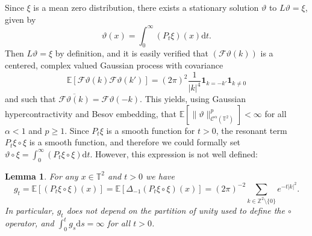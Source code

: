 \documentclass[11pt,a4paper]{article}
\newcommand{\mathd}{\mathrm{d}}
\newtheorem{lemma}[theorem]{Lemma}
\theoremstyle{remark}
\newcommand{\E}{\mathbb{E}}
\newcommand{\CC}{\ensuremath{\mathscr{C}}}
\newcommand{\CF}{\ensuremath{\mathscr{F}}}
\begin{document}
Since $\xi$ is a mean zero distribution, there exists a stationary solution $\vartheta$ to $L \vartheta = \xi$, given by
\[
   \vartheta(x) = \int_0^\infty (P_t \xi) (x) \mathd t.
\]
Then $L \vartheta = \xi$ by definition, and it is easily verified that $(\CF \vartheta(k))$ is a centered, complex valued Gaussian process with covariance
\[
   \E[ \CF \vartheta(k) \CF \vartheta(k')] = (2\pi)^2 \frac{1}{|k|^4} \mathbf{1}_{k = - k'} \mathbf{1}_{k \neq 0}
\]
and such that $\overline{\CF \vartheta(k)} = \CF \vartheta(-k)$. This yields, using Gaussian hypercontractivity and Besov embedding, that $\E[\| \vartheta\|_{\CC^\alpha(\mathbb{T}^2)}^p] < \infty$ for all $\alpha < 1$ and $p \geqslant 1$. 
Since $P_t \xi$ is a smooth function for $t > 0$, the resonant term $P_t \xi \circ \xi$ is a smooth function, and therefore we could formally set $\vartheta \circ \xi = \int_0^\infty (P_t \xi \circ \xi) \mathd t$. However, this expression is not well defined:

\begin{lemma}\label{l:anderson area expectation}
   For any $x \in \mathbb{T}^2$ and $t > 0$ we have
   \[
      g_t = \E[(P_t \xi \circ \xi)(x)] = \E[ \Delta_{- 1} (P_t \xi \circ \xi ) ( x ) ] = (2\pi)^{-2} \sum_{k \in\mathbb{Z}^2\setminus \{0\}} e^{- t | k |^2}.
   \]
   In particular, $g_t$ does not depend on the partition of unity used to define the $\circ$ operator, and $\int_0^t g_s \mathd s = \infty$ for all $t > 0$.
\end{lemma}
\end{document}
